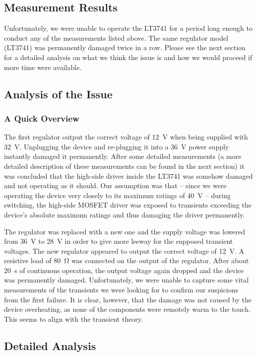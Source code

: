 \subsection{Measurement Results}

Unfortunately, we were unable to  operate the LT3741 for a period long enough to
conduct any of the measurements listed above.  The same regulator model (LT3741)
was  permanently  damaged  twice  in  a row. Please see the next section  for  a
detailed analysis on what we think the issue is and how we would proceed if more
time were available.


\subsection{Analysis of the Issue}

\subsubsection{A Quick Overview}

The first regulator output the  correct  voltage  of  \SI{12}{\volt}  when being
supplied with \SI{32}{\volt}.  Unplugging  the  device and re-plugging it into a
\SI{36}{\volt}  power  supply  instantly  damaged  it  permanently.  After  some
detailed measurements (a more detailed description of  these measurements can be
found in the next section) it was concluded that the high-side driver inside the
LT3741 was somehow damaged  and  not  operating as it should. Our assumption was
that -- since we were operating the device very  closely  to its maximum ratings
of  \SI{40}{\volt} -- during switching, the high-side MOSFET driver was  exposed
to transients exceeding the device's absolute maximum  ratings and thus damaging
the driver permanently.

The  regulator  was  replaced with a new one and the supply voltage was  lowered
from \SI{36}{\volt} to \SI{28}{\volt} in order  to  give  more  leeway  for  the
supposed transient voltages. The new  regulator  appeared  to output the correct
voltage of  \SI{12}{\volt}.  A  resistive load of \SI{80}{\ohm} was connected on
the output  of  the  regulator.  After  about  \SI{20}{\second}  of  continuous
operation,  the  output  voltage  again  dropped and the device was  permanently
damaged. Unfortunately, we were unable to capture some vital measurements of the
transients we were looking for to confirm our suspicions from the first failure.
It is clear, however, that the damage was not caused by the  device overheating,
as none  of  the components were remotely warm to the touch. This seems to align
with the transient theory.


\subsection{Detailed Analysis}


